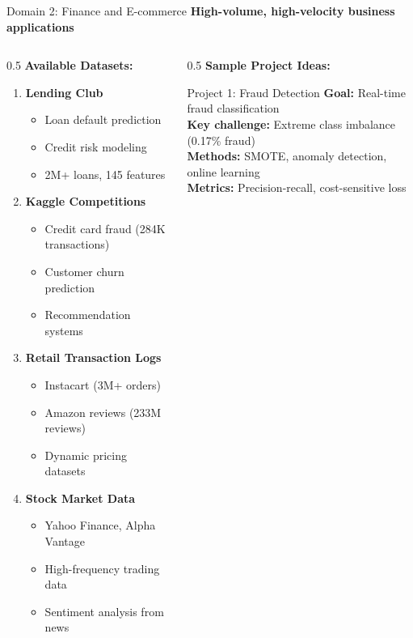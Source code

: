 \begin{frame}{Domain 2: Finance and E-commerce}
\textbf{High-volume, high-velocity business applications}

\begin{columns}
\begin{column}{0.5\textwidth}
\textbf{Available Datasets:}

\begin{enumerate}
\item \textbf{Lending Club} \cite{lendingclub}
   \begin{itemize}
   \item Loan default prediction
   \item Credit risk modeling
   \item 2M+ loans, 145 features
   \end{itemize}

\item \textbf{Kaggle Competitions}
   \begin{itemize}
   \item Credit card fraud (284K transactions)
   \item Customer churn prediction
   \item Recommendation systems
   \end{itemize}

\item \textbf{Retail Transaction Logs}
   \begin{itemize}
   \item Instacart (3M+ orders)
   \item Amazon reviews (233M reviews)
   \item Dynamic pricing datasets
   \end{itemize}

\item \textbf{Stock Market Data}
   \begin{itemize}
   \item Yahoo Finance, Alpha Vantage
   \item High-frequency trading data
   \item Sentiment analysis from news
   \end{itemize}
\end{enumerate}
\end{column}

\begin{column}{0.5\textwidth}
\textbf{Sample Project Ideas:}

\begin{block}{Project 1: Fraud Detection}
\textbf{Goal:} Real-time fraud classification\\
\textbf{Key challenge:} Extreme class imbalance (0.17\% fraud)\\
\textbf{Methods:} SMOTE, anomaly detection, online learning\\
\textbf{Metrics:} Precision-recall, cost-sensitive loss
\end{block}


\end{column}
\end{columns}
\end{frame}
